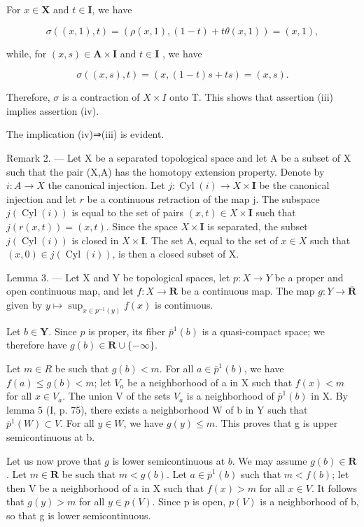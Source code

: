 For \(x\in \mathbf{X}\) and \(t\in \mathbf{I}\), we have

\[
\sigma ((x, 1), t) = (\rho (x, 1), (1 - t) + t \theta (x, 1)) = (x, 1),
\]

while, for \((x,s)\in\mathbf{A}\times\mathbf{I}\) and \(t\in\mathbf{I}\) , we have

\[
\sigma ((x, s), t) = (x, (1 - t) s + t s) = (x, s).
\]

Therefore, \(\sigma\) is a contraction of \(X\times I\) onto T. This shows that assertion (iii) implies assertion (iv).

The implication (iv)⇒(iii) is evident.

Remark 2. --- Let X be a separated topological space and let A be a subset of X such that the pair (X,A) has the homotopy extension property. Denote by \(i\colon A\to X\) the canonical injection. Let \(j\colon\operatorname{Cyl}(i)\to X\times\mathbf{I}\) be the canonical injection and let \(r\) be a continuous retraction of the map j. The subspace \(j(\operatorname{Cyl}(i))\) is equal to the set of pairs \((x,t)\in X\times\mathbf{I}\) such that \(j(r(x,t))=(x,t)\). Since the space \(X\times\mathbf{I}\) is separated, the subset \(j(\operatorname{Cyl}(i))\) is closed in \(X\times\mathbf{I}\). The set A, equal to the set of \(x\in X\) such that \((x,0)\in j(\operatorname{Cyl}(i))\), is then a closed subset of X.

Lemma 3. --- Let X and Y be topological spaces, let \(p \colon X \to Y\) be a proper and open continuous map, and let \(f \colon X \to \mathbf{R}\) be a continuous map. The map \(g \colon Y \to \overline{\mathbf{R}}\) given by \(y \mapsto \sup_{x\in p^{-1}(y)} f(x)\) is continuous.

Let \(b \in \mathbf{Y}\). Since \(p\) is proper, its fiber \(\overline{p}^1(b)\) is a quasi-compact space; we therefore have \(g(b) \in \mathbf{R} \cup \{-\infty\}\).

Let \(m \in R\) be such that \(g(b) < m\). For all \(a \in \overline{p}^{1}(b)\), we have \(f(a) \leqslant g(b) < m\); let \(V_{a}\) be a neighborhood of a in X such that \(f(x) < m\) for all \(x \in V_{a}\). The union V of the sets \(V_{a}\) is a neighborhood of \(\overline{p}^{1}(b)\) in X. By lemma 5 (I, p. 75), there exists a neighborhood W of b in Y such that \(\overline{p}^{1}(W) \subset V\). For all \(y \in W\), we have \(g(y) \leqslant m\). This proves that g is upper semicontinuous at b.

Let us now prove that \(g\) is lower semicontinuous at \(b\). We may assume \(g(b)\in\mathbf{R}\). Let \(m\in\mathbf{R}\) be such that \(m<g(b)\). Let \(a\in\overline{p}^1(b)\) such that \(m<f(b)\); let then V be a neighborhood of a in X such that \(f(x)>m\) for all \(x\in V\). It follows that \(g(y)>m\) for all \(y\in p(V)\). Since p is open, \(p(V)\) is a neighborhood of b, so that g is lower semicontinuous.

